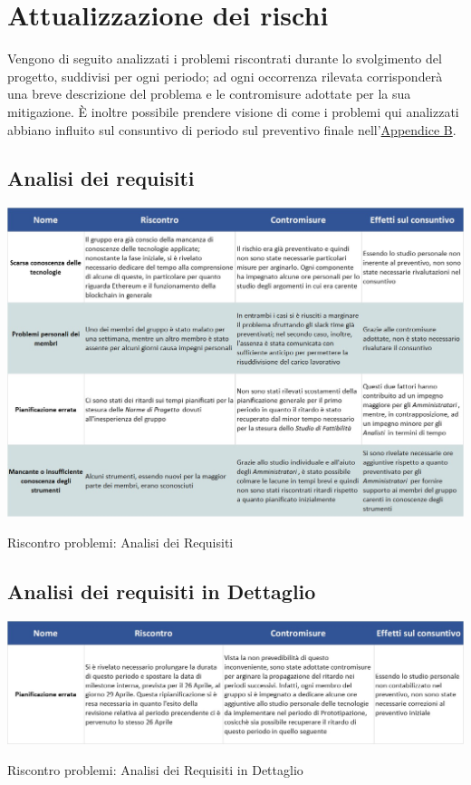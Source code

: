 \newpage

\section{Attualizzazione dei rischi} \label{RiscontroRischi}

Vengono di seguito analizzati i problemi riscontrati durante lo svolgimento del progetto, suddivisi per ogni periodo; ad ogni occorrenza rilevata corrisponderà una breve descrizione del problema e le contromisure adottate per la sua mitigazione. È inoltre possibile prendere visione di come i problemi qui analizzati abbiano influito sul consuntivo di periodo sul preventivo finale nell'\hyperref[ConsuntivoPeriodo]{Appendice B}.\\

\subsection{Analisi dei requisiti}
\begin{table}[h!]
	\centerline{\includegraphics[scale=0.55]{img/Rischi/RiscontroProblemi-AnalisiRequisiti.jpg}}
	\caption{Riscontro problemi: Analisi dei Requisiti}
\end{table}
\clearpage

\subsection{Analisi dei requisiti in Dettaglio} \label{RiscontroAnalisiDettaglio}
\begin{table}[h!]
	\centerline{\includegraphics[scale=0.55]{img/Rischi/RiscontroProblemi-AnalisiRequisitiDettaglio.jpg}}
	\caption{Riscontro problemi: Analisi dei Requisiti in Dettaglio}
\end{table}

